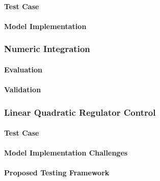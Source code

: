 \paragraph{Test Case}
\paragraph{Model Implementation}
\subsubsection{Numeric Integration}
\paragraph{Evaluation}
\paragraph{Validation}
\subsubsection{Linear Quadratic Regulator Control}
\paragraph{Test Case}
\paragraph{Model Implementation Challenges}
\paragraph{Proposed Testing Framework}